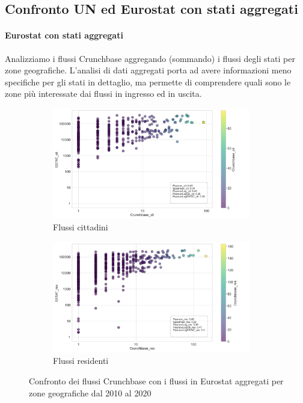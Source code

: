\subsection{Confronto UN ed Eurostat con stati aggregati}
\paragraph{Eurostat con stati aggregati}
Analizziamo i flussi Crunchbase aggregando (sommando) i flussi degli stati per zone geografiche.
L'analisi di dati aggregati porta ad avere informazioni meno specifiche per gli stati in dettaglio, ma permette di comprendere quali sono le zone più interessate dai flussi in ingresso ed in uscita.
\label{ESTAT_aggregated}
\begin{figure}[!ht]
    \centering
    \begin{subfigure}{\textwidth}
        \centering
        \includegraphics[width=0.95\textwidth]{images/flows/aggregated/ESTAT_cit_True.png}
        \caption{Flussi cittadini}
        \label{fig:estatcrunchtrue_cit}
    \end{subfigure}
    \begin{subfigure}{\textwidth}
        \centering
        \includegraphics[width=0.95\textwidth]{images/flows/aggregated/ESTAT_res_True.png}
        \caption{Flussi residenti}
        \label{fig:estatcrunchtrue_res}
    \end{subfigure}
    \caption{Confronto dei flussi Crunchbase con i flussi in Eurostat aggregati per zone geografiche dal 2010 al 2020}
    \label{fig:estatcrunchtrue}
\end{figure}
